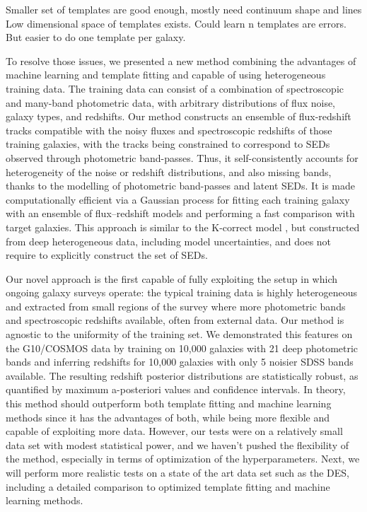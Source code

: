 \documentclass[aps,prd,showpacs,superscriptaddress,groupedaddress]{revtex4}  %
\begin{document}
Smaller set of templates are good enough, mostly need continuum shape and lines
Low dimensional space of templates exists. Could learn n templates are errors. But easier to do one template per galaxy.

To resolve those issues, we presented a new method combining the advantages of machine learning and template fitting and capable of using heterogeneous training data.
The training data can consist of a combination of spectroscopic and many-band photometric data, with arbitrary distributions of flux noise, galaxy types, and redshifts.
Our method constructs an ensemble of flux-redshift tracks compatible with the noisy fluxes and spectroscopic redshifts of those training galaxies, with the tracks being constrained to correspond to SEDs  observed through photometric band-passes.
Thus, it self-consistently accounts for heterogeneity of the noise or redshift distributions, and also missing bands, thanks to the modelling of photometric band-passes and latent SEDs. 
It is made computationally efficient via a Gaussian process for fitting each training galaxy with an ensemble of flux--redshift models and performing a fast comparison with target galaxies. 
This approach is similar to the K-correct model \citep{Blanton:2007}, but constructed from deep heterogeneous data, including model uncertainties, and does not require to explicitly construct the set of SEDs.

Our novel approach is the first capable of fully exploiting the setup in which ongoing galaxy surveys operate: the typical training data is highly heterogeneous and extracted from small regions of the survey where more photometric bands and spectroscopic redshifts available, often from external data. 
Our method is agnostic to the uniformity of the training set.
We demonstrated this features on the G10/COSMOS data by training on 10,000 galaxies with 21 deep photometric bands and inferring redshifts for 10,000 galaxies with only 5 noisier SDSS bands available. 
The resulting redshift posterior distributions are statistically robust, as quantified by maximum a-posteriori values and confidence intervals. 
In theory, this method should outperform both template fitting and machine learning methods since it has the advantages of both, while being more flexible and capable of exploiting more data. 
However, our tests were on a relatively small data set with modest statistical power, and we haven't pushed the flexibility of the method, especially in terms of optimization of the hyperparameters.
Next, we will perform more realistic tests on a state of the art data set such as the DES, including a detailed comparison to optimized template fitting and machine learning methods.
\end{document}
